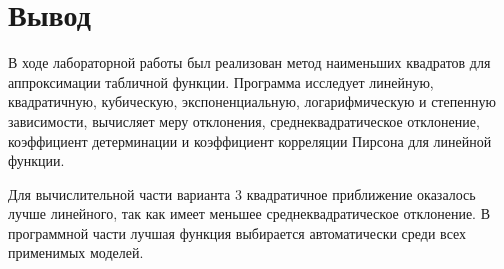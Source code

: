 \documentclass[a4paper,14pt]{extarticle}
\begin{document}
\section{Вывод}

В ходе лабораторной работы был реализован метод наименьших квадратов для аппроксимации табличной функции. Программа исследует линейную, квадратичную, кубическую, экспоненциальную, логарифмическую и степенную зависимости, вычисляет меру отклонения, среднеквадратическое отклонение, коэффициент детерминации и коэффициент корреляции Пирсона для линейной функции.

Для вычислительной части варианта 3 квадратичное приближение оказалось лучше линейного, так как имеет меньшее среднеквадратическое отклонение. В программной части лучшая функция выбирается автоматически среди всех применимых моделей.
\end{document}
